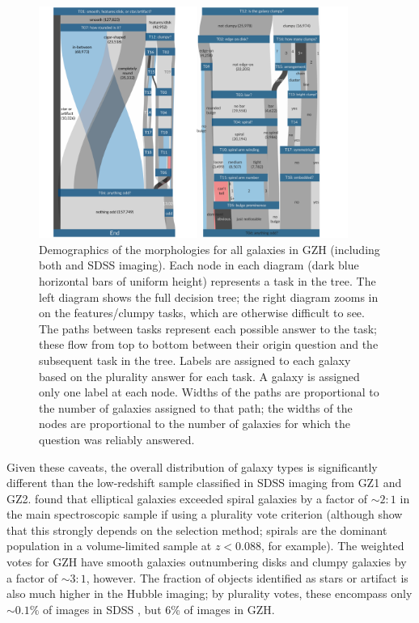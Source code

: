 \documentclass[twocolumn]{aastex6}
\begin{document}
\begin{figure}
\center
\includegraphics[width=0.90\textwidth]{figures/sankey_both.png}
\caption{Demographics of the morphologies for all galaxies in GZH (including both \hst{} and SDSS imaging). Each node in each diagram (dark blue horizontal bars of uniform height) represents a task in the tree. The left diagram shows the full decision tree; the right diagram zooms in on the features/clumpy tasks, which are otherwise difficult to see. The paths between tasks represent each possible answer to the task; these flow from top to bottom between their origin question and the subsequent task in the tree. Labels are assigned to each galaxy based on the plurality answer for each task. A galaxy is assigned only one label at each node. Widths of the paths are proportional to the number of galaxies assigned to that path; the widths of the nodes are proportional to the number of galaxies for which the question was reliably answered.}
\label{fig:sankey}
\end{figure}

Given these caveats, the overall distribution of galaxy types is significantly different than the low-redshift sample classified in SDSS imaging from GZ1 and GZ2. \citet{lin11} found that elliptical galaxies exceeded spiral galaxies by a factor of $\sim2:1$ in the main spectroscopic sample if using a plurality vote criterion (although \citealt{bam09} show that this strongly depends on the selection method; spirals are the dominant population in a volume-limited sample at $z<0.088$, for example). The weighted votes for GZH have smooth galaxies outnumbering disks and clumpy galaxies by a factor of $\sim3:1$, however. The fraction of objects identified as stars or artifact is also much higher in the Hubble imaging; by plurality votes, these encompass only $\sim0.1\%$ of images in SDSS \citep{wil13}, but 6\% of images in GZH. 
\end{document}
